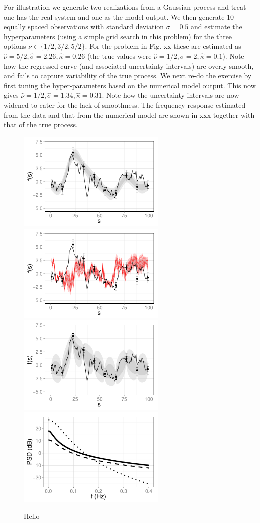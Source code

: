 \documentclass[10pt,a4paper]{article}
\begin{document}
For illustration we generate two realizations from a Gaussian process and treat one has the real system and one as the model output. We then generate 10 equally spaced observations with standard deviation $\sigma = 0.5$ and estimate the hyperparameters (using a simple grid search in this problem) for the three options $\nu \in \{ 1/2, 3/2, 5/2\}$. For the problem in Fig. xx these are estimated as $\hat\nu = 5/2, \hat\sigma = 2.26, \hat \kappa = 0.26$ (the true values were $\hat\nu = 1/2, \sigma = 2, \hat \kappa = 0.1$). Note how the regressed curve (and associated uncertainty intervals) are overly smooth, and fails to capture variability of the true process.  We next re-do the exercise by first tuning the hyper-parameters based on the numerical model output. This now gives $\hat\nu = 1/2, \hat\sigma = 1.34, \hat \kappa = 0.31$. Note how the uncertainty intervals are now widened to cater for the lack of smoothness. The frequency-response estimated from the data and that from the numerical model are shown in xxx together with that of the true process. 

\begin{figure}[t!]
\includegraphics[width=2.8in]{GP1.pdf}
\includegraphics[width=2.8in]{GP2.pdf}
\includegraphics[width=2.8in]{GP3.pdf}
\includegraphics[width=2.8in]{GP4.pdf}
\caption{Hello}
\end{figure}
\end{document}
